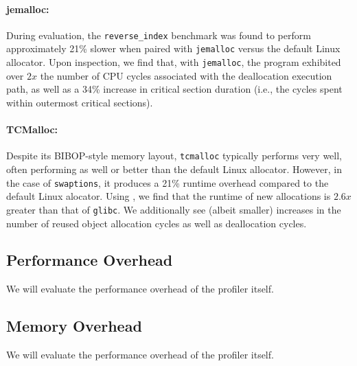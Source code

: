 \paragraph{jemalloc:}
During evaluation, the \texttt{reverse\_index} benchmark was found to perform approximately 21\% slower when paired with \texttt{jemalloc} versus the default Linux allocator. Upon inspection, we find that, with \texttt{jemalloc}, the program exhibited over $2x$ the number of CPU cycles associated with the deallocation execution path, as well as a 34\% increase in critical section duration (i.e., the cycles spent within outermost critical sections).

\paragraph{TCMalloc:}
Despite its BIBOP-style memory layout, \texttt{tcmalloc} typically performs very well, often performing as well or better than the default Linux allocator. However, in the case of \texttt{swaptions}, it produces a 21\% runtime overhead compared to the default Linux alocator. Using \MP{}, we find that the runtime of new allocations  is $2.6x$ greater than that of \texttt{glibc}. We additionally see (albeit smaller) increases in the number of reused object allocation cycles as well as deallocation cycles.



\subsection{Performance Overhead}
We will evaluate the performance overhead of the profiler itself. 

\subsection{Memory Overhead}
We will evaluate the performance overhead of the profiler itself. 

